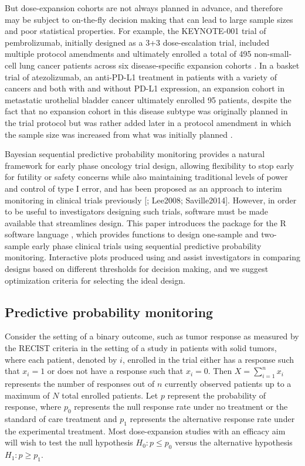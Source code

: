 But dose-expansion cohorts are not always planned in advance, and
therefore may be subject to on-the-fly decision making that can lead to
large sample sizes and poor statistical properties. For example, the
KEYNOTE-001 trial of pembrolizumab, initially designed as a 3+3
dose-escalation trial, included multiple protocol amendments and
ultimately enrolled a total of 495 non-small-cell lung cancer patients
across six disease-specific expansion cohorts \citep{Garon2015}. In a
basket trial of atezolizumab, an anti-PD-L1 treatment in patients with a
variety of cancers and both with and without PD-L1 expression, an
expansion cohort in metastatic urothelial bladder cancer ultimately
enrolled 95 patients, despite the fact that no expansion cohort in this
disease subtype was originally planned in the trial protocol but was
rather added later in a protocol amendment in which the sample size was
increased from what was initially planned
\citep{Petrylak2018, Powles2014}.

Bayesian sequential predictive probability monitoring provides a natural
framework for early phase oncology trial design, allowing flexibility to
stop early for futility or safety concerns while also maintaining
traditional levels of power and control of type I error, and has been
proposed as an approach to interim monitoring in clinical trials
previously {[}\citet{Dmitrienko2006}; Lee2008; Saville2014{]}. However,
in order to be useful to investigators designing such trials, software
must be made available that streamlines design. This paper introduces
the  package for the R software language \citep{RCT2020},
which provides functions to design one-sample and two-sample early phase
clinical trials using sequential predictive probability monitoring.
Interactive plots produced using  and 
assist investigators in comparing designs based on different thresholds
for decision making, and we suggest optimization criteria for selecting
the ideal design.

\hypertarget{predictive-probability-monitoring}{%
\subsection{Predictive probability
monitoring}\label{predictive-probability-monitoring}}

Consider the setting of a binary outcome, such as tumor response as
measured by the RECIST criteria in the setting of a study in patients
with solid tumors, where each patient, denoted by \(i\), enrolled in the
trial either has a response such that \(x_i = 1\) or does not have a
response such that \(x_i = 0\). Then \(X = \sum_{i=1}^n x_i\) represents
the number of responses out of \(n\) currently observed patients up to a
maximum of \(N\) total enrolled patients. Let \(p\) represent the
probability of response, where \(p_0\) represents the null response rate
under no treatment or the standard of care treatment and \(p_1\)
represents the alternative response rate under the experimental
treatment. Most dose-expansion studies with an efficacy aim will wish to
test the null hypothesis \(H_0: p \leq p_0\) versus the alternative
hypothesis \(H_1: p \geq p_1\).

